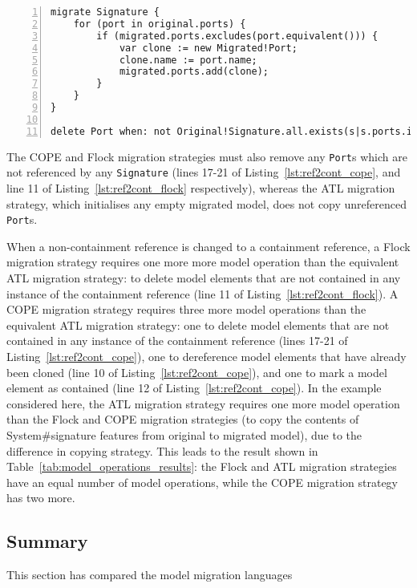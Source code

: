 \begin{lstlisting}[basicstyle=\ttfamily\footnotesize, flexiblecolumns=true, numbers=left, nolol=true, caption=Change R to C model migration in Flock, label=lst:ref2cont_flock, language=Flock, tabsize=2]
migrate Signature {
	for (port in original.ports) {
		if (migrated.ports.excludes(port.equivalent())) {
			var clone := new Migrated!Port;
			clone.name := port.name;
			migrated.ports.add(clone);
		}
	}
}

delete Port when: not Original!Signature.all.exists(s|s.ports.includes(original))
\end{lstlisting}


The COPE and Flock migration strategies must also remove any \texttt{Port}s which are not referenced by any \texttt{Signature} (lines 17-21 of Listing~\ref{lst:ref2cont_cope}, and line 11 of Listing~\ref{lst:ref2cont_flock} respectively), whereas the ATL migration strategy, which initialises any empty migrated model, does not copy unreferenced \texttt{Port}s.

When a non-containment reference is changed to a containment reference, a Flock migration strategy requires one more more model operation than the equivalent ATL migration strategy: to delete model elements that are not contained in any instance of the containment reference (line 11 of Listing~\ref{lst:ref2cont_flock}). A COPE migration strategy requires three more model operations than the equivalent ATL migration strategy: one to delete model elements that are not contained in any instance of the containment reference (lines 17-21 of Listing~\ref{lst:ref2cont_cope}), one to dereference model elements that have already been cloned (line 10 of Listing~\ref{lst:ref2cont_cope}), and one to mark a model element as contained (line 12 of Listing~\ref{lst:ref2cont_cope}).  In the example considered here, the ATL migration strategy requires one more model operation than the Flock and COPE migration strategies (to copy the contents of System\#signature features from original to migrated model), due to the difference in copying strategy. This leads to the result shown in Table~\ref{tab:model_operations_results}: the Flock and ATL migration strategies have an equal number of model operations, while the COPE migration strategy has two more.


\subsection{Summary}
This section has compared the model migration languages

